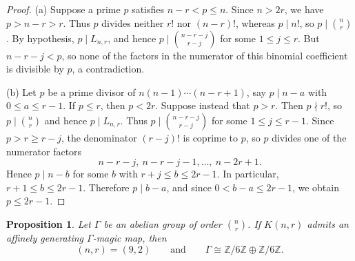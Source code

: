 \documentclass[11pt,reqno]{amsart}
\theoremstyle{plain}
\newtheorem{proposition}[theorem]{Proposition}
\theoremstyle{definition}
\theoremstyle{remark}
\begin{document}
\begin{proof}
(a) Suppose a prime $p$ satisfies $n-r<p\le n$. Since $n>2r$, we have
$p>n-r>r$. Thus $p$ divides neither $r!$ nor $(n-r)!$, whereas $p\mid n!$,
so $p\mid\binom{n}{r}$. By hypothesis, $p\mid L_{n,r}$, and hence
$p\mid\binom{n-r-j}{r-j}$ for some $1\le j\le r$. But
$n-r-j<p$, so none of the factors in the numerator of this binomial coefficient
is divisible by $p$, a contradiction.

(b) Let $p$ be a prime divisor of $n(n-1)\cdots(n-r+1)$, say $p\mid n-a$ with
$0\le a\le r-1$. If $p\le r$, then $p<2r$. Suppose instead that $p>r$.
Then $p\nmid r!$, so $p\mid\binom{n}{r}$ and hence $p\mid L_{n,r}$. Thus
$p\mid\binom{n-r-j}{r-j}$ for some $1\le j\le r-1$. Since
$p>r\ge r-j$, the denominator $(r-j)!$ is coprime to $p$, so $p$ divides one
of the numerator factors
\[
  n-r-j,\ n-r-j-1,\dots,\ n-2r+1.
\]
Hence $p\mid n-b$ for some $b$ with $r+j\le b\le2r-1$. In particular,
$r+1\le b\le2r-1$. Therefore $p\mid b-a$, and since
$0<b-a\le2r-1$, we obtain $p\le2r-1$.
\end{proof}

\begin{proposition}\label{prop:arith}
Let $\Gamma$ be an abelian group of order $\binom{n}{r}$. If $K(n,r)$ admits an
affinely generating $\Gamma$-magic map, then
\[
  (n,r)=(9,2)
  \qquad\text{and}\qquad
  \Gamma\cong\mathbb Z/6\mathbb Z\oplus\mathbb Z/6\mathbb Z.
\]
\end{proposition}
\end{document}
